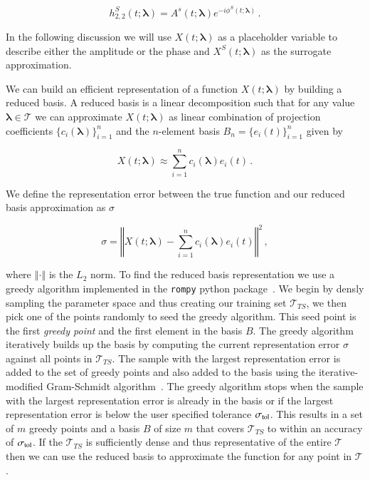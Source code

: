 \documentclass[aps,prd,reprint,superscriptaddress,preprintnumbers,showpacs,nofootinbib]{revtex4-1}
\begin{document}
\begin{equation}
h_{2,2}^{S}(t;\boldsymbol{\lambda}) = A^{s}(t;\boldsymbol{\lambda}) e^{-i
\phi^{S}(t;\boldsymbol{\lambda})} \, .
\end{equation}

In the following discussion we will use
$X(t;\boldsymbol{\lambda})$ as a placeholder variable to describe either the
amplitude or the phase and $X^{S}(t;\boldsymbol{\lambda})$ as the surrogate
approximation.

We can build an efficient representation of a function
$X(t;\boldsymbol{\lambda})$ by building a reduced basis. A reduced basis is a
linear decomposition such that for any value $\boldsymbol{\lambda} \in
\mathcal{T}$ we can approximate $X(t; \boldsymbol{\lambda})$ as
linear combination of projection coefficients $\{c_i(\boldsymbol{\lambda})\}_{i=1}^{n}$
and the $n$-element basis $B_n = \{e_i(t)\}_{i=1}^{n}$ given by

\begin{equation}
X(t; \boldsymbol{\lambda}) \approx \sum_{i=1}^{n} c_{i}(\boldsymbol{\lambda}) e_{i}(t) \, .
\end{equation}

We define the representation error between the true function and our reduced
basis approximation as $\sigma$

\begin{equation}
\sigma = \left\Vert  X(t; \boldsymbol{\lambda}) - \sum_{i=1}^{n} c_{i}(\boldsymbol{\lambda}) e_{i}(t) \right\Vert^2 \, ,
\end{equation}

where $\left\Vert \cdot \right\Vert$ is the $L_2$ norm. To find the reduced basis
representation we use a greedy algorithm implemented in the {\tt rompy} python
package~\cite{rompy,PhysRevX.4.031006}. We begin by densly sampling the
parameter space and thus creating our training set $\mathcal{T}_{TS}$, we then
pick one of the points randomly to seed the greedy algorithm. This seed point is
the first \emph{greedy point} and the first element in the basis $B$. The greedy
algorithm iteratively builds up the basis by computing the current
representation error $\sigma$ against all points in $\mathcal{T}_{TS}$. The
sample with the largest representation error is added to the set of greedy
points and also added to the basis using the iterative-modified Gram-Schmidt
algorithm~\cite{Hoffmann2005IterativeAF}. The greedy algorithm stops when the
sample with the largest representation error is already in the basis or if the
largest representation error is below the user specified tolerance
$\sigma_{\rm{tol}}$. This results in a set of $m$ greedy points and a basis $B$
of size $m$ that covers $\mathcal{T}_{TS}$ to within an accuracy of
$\sigma_{\rm{tol}}$. If the $\mathcal{T}_{TS}$ is sufficiently dense and thus
representative of the entire $\mathcal{T}$ then we can use the reduced basis to
approximate the function for any point in $\mathcal{T}$.
\end{document}
